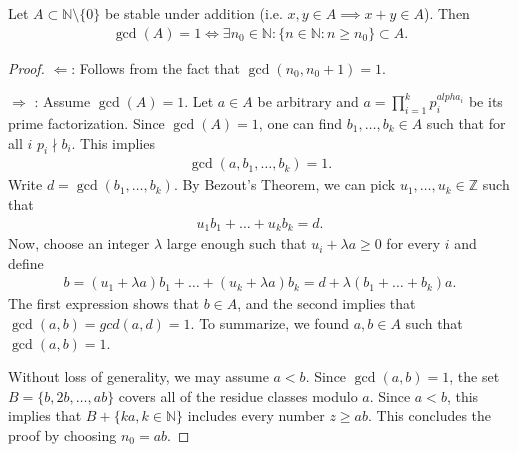 \begin{lemma}
	Let $A \subset \mathbb{N}\setminus \{0\}$ be stable under addition (i.e. $x,y\in A \implies x+y \in A$). Then
	\begin{align}
		\gcd (A) = 1 \iff \exists n_0 \in \mathbb{N}: \{n \in \mathbb{N}: n \geq n_0 \} \subset A.	
	\end{align}
\end{lemma}
\begin{proof}
	$\Longleftarrow$: Follows from the fact that $\gcd(n_0, n_0+1)=1$.

	$\Longrightarrow$ : Assume $\gcd(A)=1$. Let $a \in A$ be arbitrary and  $a =  \prod_{i=1}^{k}p_{i}^{alpha_i}$ be its prime factorization. Since $\gcd(A)=1$, one can find $b_1, \ldots, b_k \in A$ such that for all $i$ $p_i \nmid b_i$. This implies
	\begin{align}
		\gcd(a,b_1,\ldots, b_k)=1.
	\end{align}
	Write $d=\gcd(b_1,\ldots, b_k)$. By Bezout's Theorem, we can pick $u_1,\ldots,u_k \in \mathbb{Z}$ such that
	\begin{align}
		u_1b_1 + \ldots + u_k b_k = d.
	\end{align}
	Now, choose an integer $\lambda $ large enough such that $u_i + \lambda a \geq 0$ for every $i$ and define
	\begin{align}
		b = (u_1 + \lambda a)b_1 + \ldots + (u_k + \lambda a)b_k = d + \lambda (b_1 + \ldots + b_k) a.
	\end{align}
	The first expression shows that $b\in A$, and the second implies that $\gcd(a,b) = gcd(a,d)=1$. To summarize, we found $a,b \in A$ such that $\gcd(a,b)=1$.

	Without loss of generality, we may assume $a<b$. Since $\gcd(a,b)=1$, the set $B=\{b, 2b, \ldots, ab\}$ covers all of the residue classes modulo $a$. Since $a<b$, this implies that $B+\{ka,  k \in \mathbb{N}\}$ includes every number $z\geq ab$. This concludes the proof by choosing $n_0 = ab$.
\end{proof}

